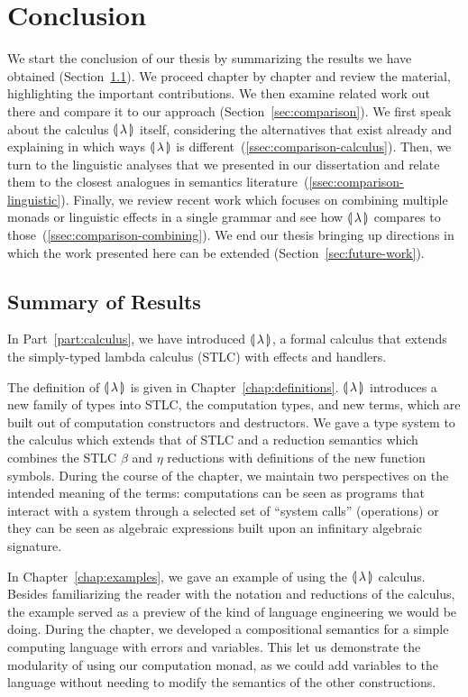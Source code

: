 \chapter{Conclusion}
\label{chap:conclusion}

We start the conclusion of our thesis by summarizing the results we have
obtained (Section~\ref{sec:summary}). We proceed chapter by chapter and
review the material, highlighting the important contributions. We then
examine related work out there and compare it to our approach
(Section~\ref{sec:comparison}). We first speak about the calculus ${\llparenthesis \, \lambda \, \rrparenthesis}$
itself, considering the alternatives that exist already and explaining in
which ways ${\llparenthesis \, \lambda \, \rrparenthesis}$ is different~(\ref{ssec:comparison-calculus}). Then, we
turn to the linguistic analyses that we presented in our dissertation and
relate them to the closest analogues in semantics
literature~(\ref{ssec:comparison-linguistic}). Finally, we review recent
work which focuses on combining multiple monads or linguistic effects in a
single grammar and see how ${\llparenthesis \, \lambda \, \rrparenthesis}$ compares to
those~(\ref{ssec:comparison-combining}). We end our thesis bringing up
directions in which the work presented here can be extended
(Section~\ref{sec:future-work}).

\minitoc


\section{Summary of Results}
\label{sec:summary}

In Part~\ref{part:calculus}, we have introduced ${\llparenthesis \, \lambda \, \rrparenthesis}$, a formal calculus
that extends the simply-typed lambda calculus (STLC) with effects and
handlers.

The definition of ${\llparenthesis \, \lambda \, \rrparenthesis}$ is given in
Chapter~\ref{chap:definitions}. ${\llparenthesis \, \lambda \, \rrparenthesis}$ introduces a new family of types
into STLC, the computation types, and new terms, which are built out of
computation constructors and destructors. We gave a type system to the
calculus which extends that of STLC and a reduction semantics which
combines the STLC $\beta$ and $\eta$ reductions with definitions of the new
function symbols. During the course of the chapter, we maintain two
perspectives on the intended meaning of the terms: computations can be seen
as programs that interact with a system through a selected set of ``system
calls'' (operations) or they can be seen as algebraic expressions built
upon an infinitary algebraic signature.

In Chapter~\ref{chap:examples}, we gave an example of using the ${\llparenthesis \, \lambda \, \rrparenthesis}$
calculus. Besides familiarizing the reader with the notation and reductions
of the calculus, the example served as a preview of the kind of language
engineering we would be doing. During the chapter, we developed a
compositional semantics for a simple computing language with errors and
variables. This let us demonstrate the modularity of using our computation
monad, as we could add variables to the language without needing to modify
the semantics of the other constructions.

